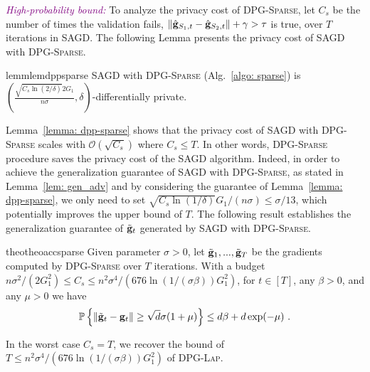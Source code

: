 \documentclass[11pt]{article}
\begin{document}
\textcolor{purple}{\textit{High-probability bound:}}
To analyze the privacy cost of \textsc{DPG-Sparse}, let $C_{s}$ be the number of times the validation fails, \ie $\| \hat {\mathbf{g}}_{S_1,t} - \hat {\mathbf{g}}_{S_2,t}\| + \gamma >  \tau$ is true, over $T$ iterations in \textsc{SAGD}. The following Lemma presents the privacy cost of \textsc{SAGD} with \textsc{DPG-Sparse}.
\begin{restatable}{lemm}{lemdppsparse}
\label{lemma: dpp-sparse}
\textsc{SAGD} with \textsc{DPG-Sparse}  (Alg.~\ref{algo: sparse}) is  
$(\frac{\sqrt{C_{s} \ln(2/\delta)} 2G_1}{n\sigma}, \delta)$-differentially private. 
\end{restatable}
Lemma~\ref{lemma: dpp-sparse} shows that the privacy cost of  \textsc{SAGD} with \textsc{DPG-Sparse} scales with $\mathcal{O}(\sqrt{C_{s}})$ where $C_{s} \leq T$. 
In other words, \textsc{DPG-Sparse} procedure saves the privacy cost of the \textsc{SAGD} algorithm. Indeed, in order to achieve the generalization guarantee of \textsc{SAGD} with \textsc{DPG-Sparse}, as stated in Lemma~\ref{lem: gen_adv} and  by considering the guarantee of Lemma~\ref{lemma: dpp-sparse},  we only need to set $\sqrt{C_{s} \ln(1/\delta)} G_1/(n\sigma) \leq \sigma/13$, which potentially improves the upper bound of $T$. 
The following result establishes the generalization guarantee of $\tilde {\mathbf{g}}_t$ generated by \textsc{SAGD} with \textsc{DPG-Sparse}.
\begin{restatable}{theo}{theoaccsparse}
\label{thm: acc_sparse}
Given parameter $\sigma > 0$, let $\tilde {\mathbf{g}}_1,...,  \tilde {\mathbf{g}}_T$ be the gradients computed by \textsc{DPG-Sparse} over $T$ iterations. With a budget $ n\sigma^2/(2G_1^2) \leq C_{s} \leq n^2 \sigma^4/(676 \ln(1/(\sigma \beta))G_1^2)$, for $t \in [T]$, any $\beta > 0$, and any $\mu > 0$ we have 
        \begin{equation*}
    \mathbb{P}\left\{\|\tilde {\mathbf{g}}_t - \mathbf{g}_t\| \geq \sqrt{d}\sigma(1+\mu)\right\} \leq d\beta + d\exp(-\mu)~.
    \end{equation*}
\end{restatable}
In the worst case $C_{s} = T$, we recover the bound of $T \leq n^2 \sigma^4/(676 \ln(1/(\sigma \beta))G_1^2)$ of \textsc{DPG-Lap}.
\end{document}

